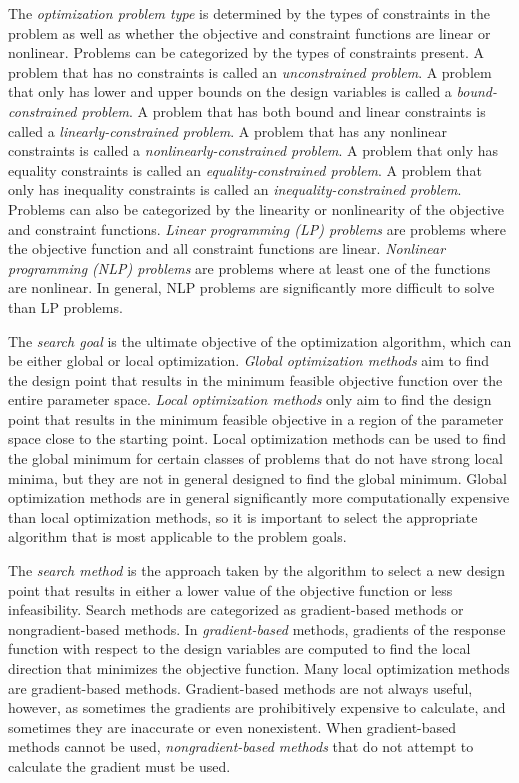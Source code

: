 The \textit{optimization problem type} is determined by the types of constraints in the problem as well as whether the objective and constraint functions are linear or nonlinear.
Problems can be categorized by the types of constraints present.
A problem that has no constraints is called an \textit{unconstrained problem}.
A problem that only has lower and upper bounds on the design variables is called a \textit{bound-constrained problem}.
A problem that has both bound and linear constraints is called a \textit{linearly-constrained problem}.
A problem that has any nonlinear constraints is called a \textit{nonlinearly-constrained problem}.
A problem that only has equality constraints is called an \textit{equality-constrained problem}.
A problem that only has inequality constraints is called an \textit{inequality-constrained problem}.
Problems can also be categorized by the linearity or nonlinearity of the objective and constraint functions.
\textit{Linear programming (LP) problems} are problems where the objective function and all constraint functions are linear.
\textit{Nonlinear programming (NLP) problems} are problems where at least one of the functions are nonlinear.
In general, NLP problems are significantly more difficult to solve than LP problems.

The \textit{search goal} is the ultimate objective of the optimization algorithm, which can be either global or local optimization.
\textit{Global optimization methods} aim to find the design point that results in the minimum feasible objective function over the entire parameter space.
\textit{Local optimization methods} only aim to find the design point that results in the minimum feasible objective in a region of the parameter space close to the starting point.
Local optimization methods can be used to find the global minimum for certain classes of problems that do not have strong local minima, but they are not in general designed to find the global minimum.
Global optimization methods are in general significantly more computationally expensive than local optimization methods, so it is important to select the appropriate algorithm that is most applicable to the problem goals.

The \textit{search method} is the approach taken by the algorithm to select a new design point that results in either a lower value of the objective function or less infeasibility.
Search methods are categorized as gradient-based methods or nongradient-based methods.
In \textit{gradient-based} methods, gradients of the response function with respect to the design variables are computed to find the local direction that minimizes the objective function.
Many local optimization methods are gradient-based methods.
Gradient-based methods are not always useful, however, as sometimes the gradients are prohibitively expensive to calculate, and sometimes they are inaccurate or even nonexistent.
When gradient-based methods cannot be used, \textit{nongradient-based methods} that do not attempt to calculate the gradient must be used.

